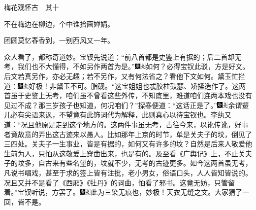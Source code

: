 梅花观怀古　其十

不在梅边在柳边，个中谁拾画婵娟。

团圆莫忆春香到，一别西风又一年。

众人看了，都称奇道妙。宝钗先说道：``前八首都是史鉴上有据的；后二首却无考，我们也不大懂得，不如另作两首为是。''{\includegraphics[width=3mm]{../Images/00004}\includegraphics[width=3mm]{../Images/00012}\footnotesize \kaishu 如何？必得宝钗此驳，方是好文。后文若真另作，亦必无趣；若不另作，又有何法省之？看他下文如何。}黛玉忙拦道：{\includegraphics[width=3mm]{../Images/00004}\includegraphics[width=3mm]{../Images/00012}\footnotesize \kaishu 好极！非黛玉不可。脂砚。}``这宝姐姐也忒胶柱鼓瑟、矫揉造作了。这两首虽于史鉴上无考，咱们虽不曾看这些外传，不知底里，难道咱们连两本戏也没有见过不成？那三岁孩子也知道，何况咱们？''探春便道：``这话正是了。''{\includegraphics[width=3mm]{../Images/00004}\includegraphics[width=3mm]{../Images/00012}\footnotesize \kaishu 余谓颦儿必有尖语来讽，不望竟有此饰词代为解释，此则真心以待宝钗也。}李纨又道：``况且他原是走到这个地方的。这两件事虽无考，古往今来，以讹传讹，好事者竟故意的弄出这古迹来以愚人。比如那年上京的时节，单是关夫子的坟，倒见了三四处。关夫子一生事业，皆是有据的，如何又有许多的坟？自然是后来人敬爱他生前为人，只怕从这敬爱上穿凿出来，也是有的。及至看《广舆记》上，不止关夫子的坟多，自古来有些名望的，坟就不少，无考的古迹更多。如今这两首虽无考，凡说书唱戏，甚至于求的签上皆有注批，老小男女，俗语口头，人人皆知皆说的。况且又并不是看了《西厢》《牡丹》的词曲，怕看了邪书。这竟无妨，只管留着。''宝钗听说，方罢了。{\includegraphics[width=3mm]{../Images/00004}\includegraphics[width=3mm]{../Images/00012}\footnotesize \kaishu 此为三染无痕也，妙极！天衣无缝之文。}大家猜了一回，皆不是。

